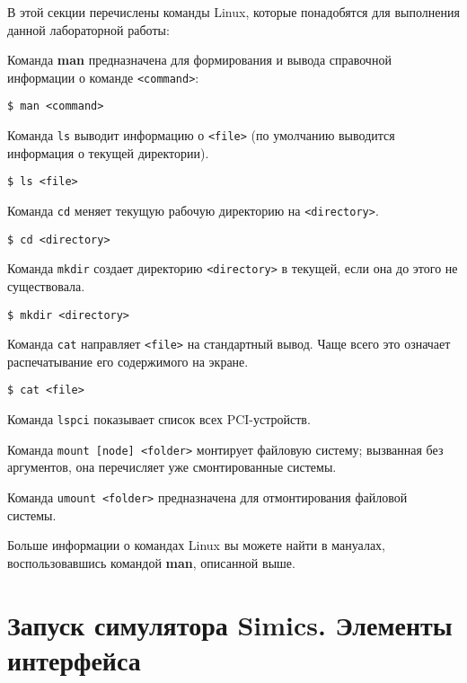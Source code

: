В этой секции перечислены команды Linux, которые понадобятся для выполнения данной лабораторной работы:

\begin{itemize*}
    \item Команда \textbf{man} предназначена для формирования и  вывода справочной информации о команде \texttt{<command>}:
\begin{lstlisting}
$ man <command>
\end{lstlisting}

    \item Команда \texttt{ls} выводит информацию о \texttt{<file>} (по умолчанию выводится информация о текущей директории).
\begin{lstlisting}
$ ls <file>
\end{lstlisting}

    \item Команда \texttt{cd} меняет текущую рабочую директорию на \texttt{<directory>}.
\begin{lstlisting}
$ cd <directory>
\end{lstlisting}

    \item Команда \texttt{mkdir} создает директорию \texttt{<directory>} в текущей, если она до этого не существовала.
\begin{lstlisting}
$ mkdir <directory>
\end{lstlisting}

    \item Команда \texttt{cat} направляет \texttt{<file>} на стандартный вывод. Чаще всего это означает распечатывание его содержимого на экране.
\begin{lstlisting}
$ cat <file>
\end{lstlisting}

    \item Команда \texttt{lspci} показывает список всех PCI-устройств.
    \item Команда \texttt{mount [node] <folder>} монтирует файловую систему; вызванная без аргументов, она перечисляет уже смонтированные системы.
    \item Команда \texttt{umount <folder>} предназначена для отмонтирования файловой системы.
\end{itemize*}

Больше информации о командах Linux вы можете найти в мануалах, воспользовавшись командой \textbf{man}, описанной выше.

\section{Запуск симулятора Simics. Элементы интерфейса}

